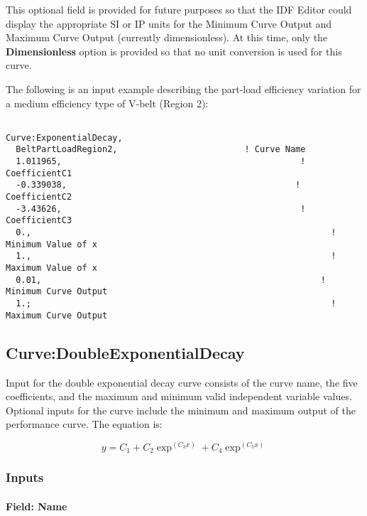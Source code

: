 This optional field is provided for future purposes so that the IDF Editor could display the appropriate SI or IP units for the Minimum Curve Output and Maximum Curve Output (currently dimensionless). At this time, only the \textbf{Dimensionless} option is provided so that no unit conversion is used for this curve.

The following is an input example describing the part-load efficiency variation for a medium efficiency type of V-belt (Region 2):

\begin{lstlisting}

Curve:ExponentialDecay,
  BeltPartLoadRegion2,                         ! Curve Name
  1.011965,                                               ! CoefficientC1
  -0.339038,                                             ! CoefficientC2
  -3.43626,                                               ! CoefficientC3
  0.,                                                           ! Minimum Value of x
  1.,                                                           ! Maximum Value of x
  0.01,                                                       ! Minimum Curve Output
  1.;                                                           ! Maximum Curve Output
\end{lstlisting}

\subsection{Curve:DoubleExponentialDecay}\label{curvedoubleexponentialdecay}

Input for the double exponential decay curve consists of the curve name, the five coefficients, and the maximum and minimum valid independent variable values. Optional inputs for the curve include the minimum and maximum output of the performance curve. The equation is:

\begin{equation}
y = {C_1} + {C_2}{\exp ^{({C_3}x)}} + {C_4}{\exp ^{({C_5}x)}}
\end{equation}

\subsubsection{Inputs}\label{inputs-18-005}

\paragraph{Field: Name}\label{field-name-18-004}

